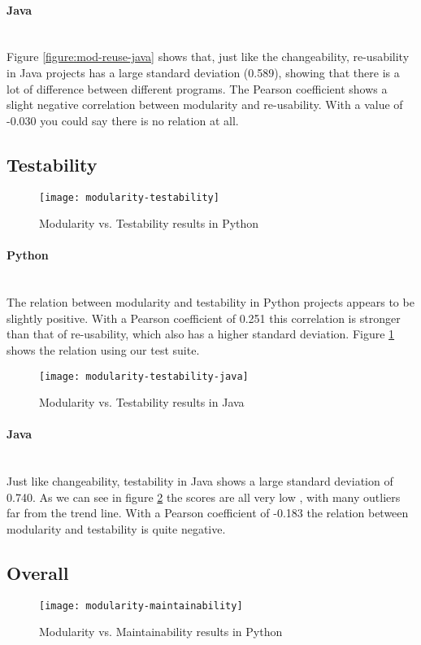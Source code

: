 \documentclass[twoside]{uva-inf-bachelor-thesis}
\newcommand{\myparagraph}[1]{\paragraph{#1}\mbox{}\\}
\begin{document}
\myparagraph{Java}
Figure \ref{figure:mod-reuse-java} shows that, just like the changeability, re-usability in Java projects has a large standard deviation (0.589), showing that  there is a lot of difference between different programs. The Pearson coefficient shows a slight negative correlation between modularity and re-usability. With a value of -0.030 you could say there is no relation at all.

\subsection{Testability}

\begin{figure}[H]
    \caption{Modularity vs. Testability results in Python}
    \label{figure:mod-test}
    \centering
        \texttt{[image: modularity-testability]}
\end{figure}

\myparagraph{Python}
The relation between modularity and testability in Python projects appears to be  slightly positive. With a Pearson coefficient of 0.251 this correlation is stronger than that of re-usability, which also has a higher standard deviation. Figure \ref{figure:mod-test} shows the relation using our test suite.

\begin{figure}[H]
    \caption{Modularity vs. Testability results in Java}
    \label{figure:mod-test-java}
    \centering
        \texttt{[image: modularity-testability-java]}
\end{figure}

\myparagraph{Java}
Just like changeability, testability in Java shows a large standard deviation of 0.740. As we can see in figure \ref{figure:mod-test-java} the scores are all very low , with many outliers far from the trend line. With a Pearson coefficient of -0.183 the relation between modularity and testability is quite negative.

\subsection{Overall}
\begin{figure}[H]
    \caption{Modularity vs. Maintainability results in Python}
    \label{figure:mod-main}
    \centering
        \texttt{[image: modularity-maintainability]}
\end{figure}
\end{document}
